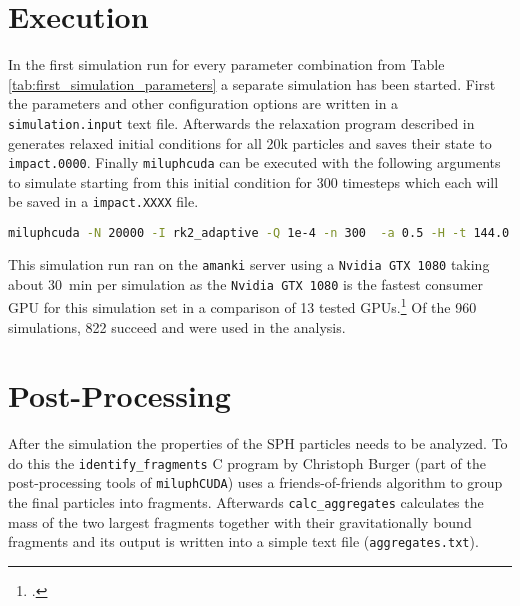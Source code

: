 \section{Execution}

In the first simulation run for every parameter combination from Table \ref{tab:first_simulation_parameters} a separate simulation has been started. First the parameters and other configuration options are written in a \mbox{\texttt{simulation.input}} text file. Afterwards the relaxation program described in \cite[24\psqq]{Burger2018} generates relaxed initial conditions for all 20k particles and saves their state to \texttt{impact.0000}. Finally \texttt{miluphcuda} can be executed with the following arguments to simulate starting from this initial condition for 300 timesteps which each will be saved in a \texttt{impact.XXXX} file.

\begin{lstlisting}[language=bash,flexiblecolumns=false]
miluphcuda -N 20000 -I rk2_adaptive -Q 1e-4 -n 300  -a 0.5 -H -t 144.0 -f impact.0000 -m material.cfg -s -g
\end{lstlisting}

This simulation run ran on the \texttt{amanki} server using a \texttt{Nvidia GTX 1080} taking about \SI{30}{\minute} per simulation as the \texttt{Nvidia GTX 1080} is the fastest consumer GPU for this simulation set in a comparison of 13 tested GPUs.\footcite{Dorninger} Of the 960 simulations, 822 succeed and were used in the analysis.


\section{Post-Processing}
\label{sec:postprocessing}

After the simulation the properties of the SPH particles needs to be analyzed. To do this the \texttt{identify\_fragments} C program by Christoph Burger (part of the post-processing tools of \texttt{miluphCUDA}) uses a friends-of-friends algorithm to group the final particles into fragments. Afterwards \texttt{calc\_aggregates} calculates the mass of the two largest fragments together with their gravitationally bound fragments and its output is written into a simple text file (\texttt{aggregates.txt}).


